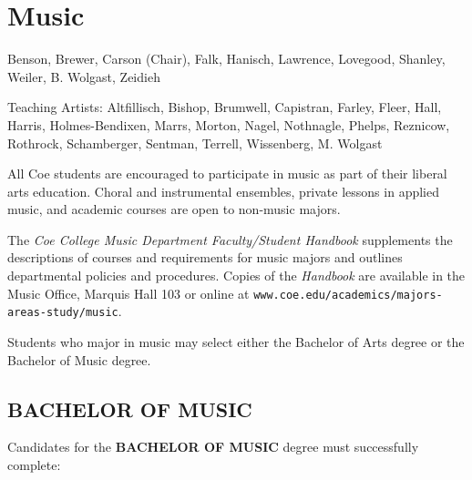 \documentclass[
  letterpaper,
]{scrbook}
\begin{document}
\section{Music}\label{sec-music}

Benson, Brewer, Carson (Chair), Falk, Hanisch, Lawrence, Lovegood,
Shanley, Weiler, B. Wolgast, Zeidieh

Teaching Artists: Altfillisch, Bishop, Brumwell, Capistran, Farley,
Fleer, Hall, Harris, Holmes-Bendixen, Marrs, Morton, Nagel, Nothnagle,
Phelps, Reznicow, Rothrock, Schamberger, Sentman, Terrell, Wissenberg,
M. Wolgast

All Coe students are encouraged to participate in music as part of their
liberal arts education. Choral and instrumental ensembles, private
lessons in applied music, and academic courses are open to non-music
majors.

The \emph{Coe College Music Department Faculty/Student Handbook}
supplements the descriptions of courses and requirements for music
majors and outlines departmental policies and procedures. Copies of the
\emph{Handbook} are available in the Music Office, Marquis Hall 103 or
online at \texttt{www.coe.edu/academics/majors-areas-study/music}.

Students who major in music may select either the Bachelor of Arts
degree or the Bachelor of Music degree.

\subsection{BACHELOR OF MUSIC}\label{bachelor-of-music}

Candidates for the \textbf{BACHELOR OF MUSIC} degree must successfully
complete:
\end{document}
